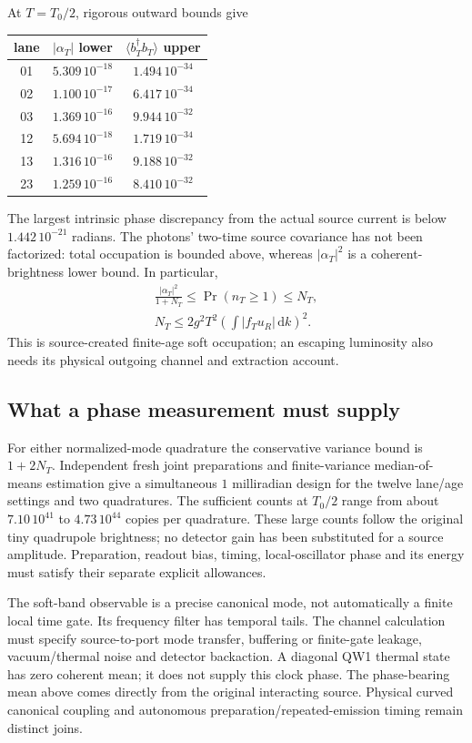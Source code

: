 \documentclass[10pt,twocolumn,letterpaper]{article}
\newcommand{\dd}{\mathrm{d}}
\begin{document}
At $T=T_0/2$, rigorous outward bounds give
\begin{center}
\begin{tabular}{c|cc}
lane&$|\alpha_T|$ lower&$\langle b_T^\dagger b_T\rangle$ upper\\\hline
01&$5.309\,10^{-18}$&$1.494\,10^{-34}$\\
02&$1.100\,10^{-17}$&$6.417\,10^{-34}$\\
03&$1.369\,10^{-16}$&$9.944\,10^{-32}$\\
12&$5.694\,10^{-18}$&$1.719\,10^{-34}$\\
13&$1.316\,10^{-16}$&$9.188\,10^{-32}$\\
23&$1.259\,10^{-16}$&$8.410\,10^{-32}$
\end{tabular}
\end{center}
The largest intrinsic phase discrepancy from the actual source current is
below $1.442\,10^{-21}$ radians. The photons' two-time source covariance
has not been factorized: total occupation is bounded above, whereas
$|\alpha_T|^2$ is a coherent-brightness lower bound. In particular,
\[
 \begin{gathered}
 \frac{|\alpha_T|^2}{1+N_T}\le\Pr(n_T\ge1)\le N_T,\\
 N_T\le2g^2T^2\left(\int|f_Tu_R|\,\dd k\right)^2.
 \end{gathered}
\]
This is source-created finite-age soft occupation; an escaping luminosity
also needs its physical outgoing channel and extraction account.

\subsection{What a phase measurement must supply}
For either normalized-mode quadrature the conservative variance bound is
$1+2N_T$. Independent fresh joint preparations and finite-variance
median-of-means estimation give a simultaneous $1$ milliradian design for
the twelve lane/age settings and two quadratures. The sufficient counts
at $T_0/2$ range from about $7.10\,10^{41}$ to $4.73\,10^{44}$ copies
per quadrature. These large counts follow the original tiny quadrupole
brightness; no detector gain has been substituted for a source amplitude.
Preparation, readout bias, timing, local-oscillator phase and its energy
must satisfy their separate explicit allowances.

The soft-band observable is a precise canonical mode, not automatically a
finite local time gate. Its frequency filter has temporal tails. The
channel calculation must specify source-to-port mode transfer, buffering
or finite-gate leakage, vacuum/thermal noise and detector backaction.
A diagonal QW1 thermal state has zero coherent mean; it does not supply
this clock phase. The phase-bearing mean above comes directly from the
original interacting source. Physical curved canonical coupling and
autonomous preparation/repeated-emission timing remain distinct joins.
\end{document}
